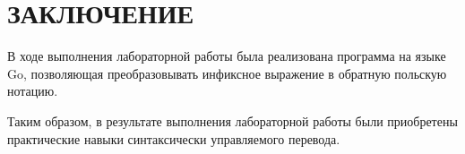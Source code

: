 \chapter*{ЗАКЛЮЧЕНИЕ}

В ходе выполнения лабораторной работы была реализована программа
на языке Go, позволяющая преобразовывать инфиксное выражение в обратную польскую нотацию.

Таким образом, в результате выполнения лабораторной работы были
приобретены практические навыки синтаксически управляемого перевода.